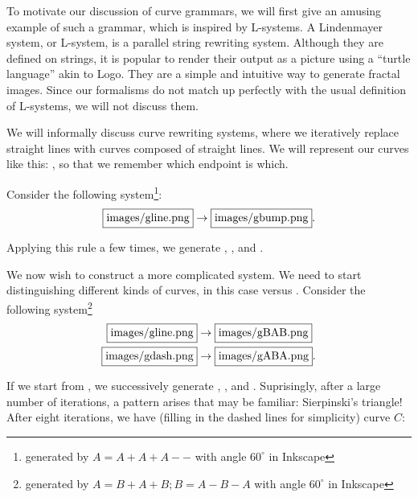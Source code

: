 

To motivate our discussion of curve grammars, we will first give an
amusing example of such a grammar, which is inspired by L-systems. A
Lindenmayer system, or L-system, is a parallel string rewriting
system. 
Although they are defined on strings, it is popular to render
their output as a picture using a ``turtle language'' akin to
Logo. They are a simple and intuitive way to generate fractal
images. Since our formalisms do not match up perfectly with the usual
definition of L-systems, we will not discuss them.

We will informally discuss curve rewriting systems, where we
iteratively replace straight lines with curves composed of straight
lines. We will represent our curves like this: , so that
we remember which endpoint is which.

Consider the following system\footnote{generated by $A=A+A+A--$ with
  angle $60^\circ$ in Inkscape}:
$$ \spk{10}{gline} \to \spk{10}{gbump} .$$

Applying this rule a few times, we generate , ,
 and .


We now wish to construct a more complicated system. We need to start
distinguishing different kinds of curves, in this case 
versus . Consider the following system\footnote{generated by 
$A=B+A+B; B=A-B-A$ with angle $60^\circ$ in Inkscape}
\begin{align*}
\spk{15}{gline} &\to \spk{15}{gBAB} \\
\spk{15}{gdash} &\to \spk{15}{gABA}.
\end{align*}

If we start from , we successively generate
, , and .  Suprisingly,
after a large number of iterations, a pattern arises that may be
familiar: Sierpinski's triangle! After eight iterations, we have
(filling in the dashed lines for simplicity) curve $C$:

